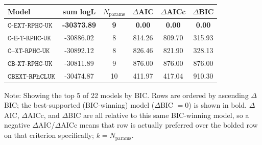 \begin{tabular}{lccccc}
\toprule
Model & sum logL & $N_{\text{params}}$ & $\Delta$AIC & $\Delta$AICc & $\Delta$BIC \\
\midrule
\textbf{$\texttt{C-EXT-RPHC-UK}$} & \textbf{-30373.89} & \textbf{9} & \textbf{0.00} & \textbf{0.00} & \textbf{0.00} \\
$\texttt{C-E-T-RPHC-UK}$ & -30886.02 & 8 & 814.26 & 809.70 & 315.93 \\
$\texttt{C--XT-RPHC-UK}$ & -30892.12 & 8 & 826.46 & 821.90 & 328.13 \\
$\texttt{CB-XT-RPHC-UK}$ & -30811.89 & 9 & 876.00 & 876.00 & 876.00 \\
$\texttt{CBEXT-RPhCLUK}$ & -30474.87 & 10 & 411.97 & 417.04 & 910.30 \\
\bottomrule
\end{tabular}
\par\footnotesize Note: Showing the top 5 of 22 models by BIC. Rows are ordered by ascending $\Delta$BIC; the best-supported (BIC-winning) model ($\Delta$BIC $= 0$) is shown in bold. $\Delta$AIC, $\Delta$AICc, and $\Delta$BIC are all relative to this same BIC-winning model, so a negative $\Delta$AIC/$\Delta$AICc means that row is actually preferred over the bolded row on that criterion specifically; $k = N_{\text{params}}$.
